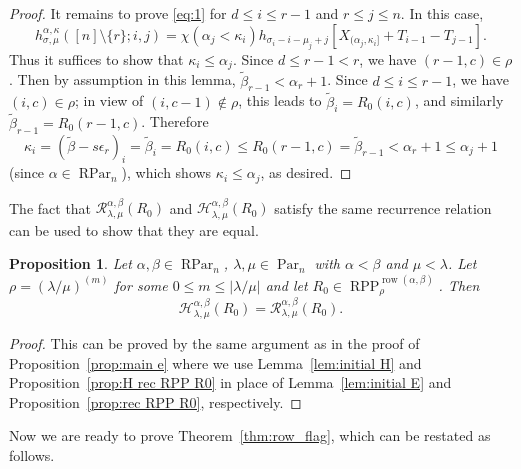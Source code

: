 \documentclass[12pt]{amsart}
\numberwithin{equation}{section}
\newtheorem{prop}[thm]{Proposition}
\theoremstyle{definition}
\newcommand\wb{\widetilde{\beta}}
\newcommand\row{\operatorname{row}}
\newcommand\Par{\operatorname{Par}}
\newcommand\RPar{\operatorname{RPar}}
\newcommand\RPP{\operatorname{RPP}}
\newcommand\lm{{\lambda/\mu}}
\newcommand\R{\mathcal{R}}
\newcommand\HH{\mathcal{H}}
\begin{document}
\begin{proof}
It remains to prove \eqref{eq:1} for $d\le i\le r-1$ and $r\le j\le n$.
In this case,
\[
      h^{\alpha,\kappa}_{\sigma,\mu}([n]\setminus\{r\};i,j)=
      \chi(\alpha_j<\kappa_i) h_{\sigma_i-i-\mu_j+j}[X_{(\alpha_j,\kappa_i]} + T_{i-1}-T_{j-1}].
\]
Thus it suffices to show that $\kappa_i\le\alpha_j$. Since $d\le r-1<r$, we have
$(r-1,c)\in \rho$. Then by assumption in this lemma, $\wb_{r-1}<\alpha_r+1$.
Since $d\le i\le r-1$, we have $(i,c)\in\rho$;
in view of $(i,c-1)\notin\rho$, this leads to $\wb_i = R_0(i,c)$, and
similarly $\wb_{r-1} = R_0(r-1,c)$. Therefore
\[
\kappa_i = (\wb-s\epsilon_r)_i = \wb_i = R_0(i,c) \le R_0(r-1,c) = \wb_{r-1}<
\alpha_r+1 \le \alpha_j+1
\]
(since $\alpha \in \RPar_n$),
which shows $\kappa_i\le\alpha_j$, as desired.
\end{proof}

The fact that $\R^{\alpha,\beta}_{\lambda,\mu}(R_0)$ and
$\HH^{\alpha,\beta}_{\lambda,\mu}(R_0)$ satisfy the same recurrence relation can
be used to show that they are equal.


\begin{prop}\label{prop:main h}
  Let $\alpha,\beta\in\RPar_n$, $\lambda,\mu\in\Par_n$ with $\alpha<\beta$ and
  $\mu<\lambda$. Let $\rho=(\lm)^{(m)}$ for some $0\le m\le|\lm|$ and let
  $R_0\in \RPP^{\row(\alpha,\beta)}_{\rho}$. Then
\[
\HH^{\alpha,\beta}_{\lambda,\mu}(R_0) = \R^{\alpha,\beta}_{\lambda,\mu}(R_0).
\]
\end{prop}
\begin{proof}
  This can be proved by the same argument as in the proof of
  Proposition~\ref{prop:main e} where we use Lemma~\ref{lem:initial H} and
  Proposition~\ref{prop:H rec RPP R0} in place of Lemma~\ref{lem:initial E} and
  Proposition~\ref{prop:rec RPP R0}, respectively.
\end{proof}



Now we are ready to prove Theorem~\ref{thm:row_flag}, which can be restated as
follows.
\end{document}
